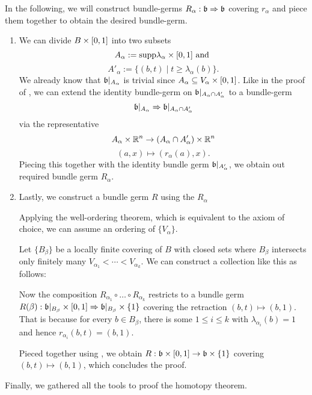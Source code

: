 \begin{scope}
\begin{myproof}
    In the following, we will construct bundle-germs $R_\alpha: \mathfrak{b} \Rightarrow{}{} \mathfrak{b}$ covering $r_\alpha$
    and piece them together to obtain the desired bundle-germ.
    \begin{enumerate}
        \item 
        We can divide $B \times [0, 1]$ into two subsets
        \[ A_\alpha := \text{supp} \lambda_\alpha \times [0, 1] \text{ and } \]
        \[ A'_\alpha := \{(b, t) \mid t \ge \lambda_\alpha(b)\}. \]
        We already know that $\mathfrak{b}\vert_{A_\alpha}$ is trivial since $A_\alpha \subseteq{} V_\alpha \times [0, 1]$.
        Like in the proof of , we can extend the identity bundle-germ on $\mathfrak{b}\vert_{A_\alpha \cap A_\alpha'}$ to a bundle-germ
        \[ \mathfrak{b}\vert_{A_\alpha} \Rightarrow{} \mathfrak{b}\vert_{A_\alpha \cap A_\alpha'} \]
        via the representative
        \[ A_\alpha \times \mathbb{R}^n \to (A_\alpha \cap A_\alpha') \times \mathbb{R}^n\]
        \[ (a, x) \mapsto (r_\alpha(a), x). \]
        Piecing this together with the identity bundle germ $\mathfrak{b}\vert_{A_\alpha'}$, we obtain out required bundle germ $R_\alpha$.
        
        \item Lastly, we construct a bundle germ $R$ using the $R_\alpha$

        Applying the well-ordering theorem, which is equivalent to the axiom of choice, we can assume an ordering of $\{ V_\alpha \}$.

        Let $\{B_\beta\}$ be a locally finite covering of $B$ with closed sets where $B_\beta$ intersects only finitely many $V_{\alpha_1} < \cdots < V_{\alpha_k}$.
        We can construct a collection like this as follows:

        Now the composition $R_{\alpha_1} \circ \ldots \circ R_{\alpha_k}$ restricts to a bundle germ $R(\beta): \mathfrak{b}\vert_{B_\beta} \times [0, 1] \Rightarrow{} \mathfrak{b}\vert_{B_\beta} \times \{1\}$ covering the retraction $(b, t) \mapsto (b, 1)$.
        That is because for every $b \in B_\beta$, there is some $1 \le i \le k$ with $\lambda_{\alpha_i}(b) = 1$ and hence $r_{\alpha_i}(b, t) = (b, 1)$.
        
        Pieced together using , we obtain $R: \mathfrak{b} \times [0, 1]\to \mathfrak{b} \times \{1\}$ covering $(b, t) \mapsto (b, 1)$, which concludes the proof.
    \end{enumerate}    
\end{myproof}

\begin{myparagraph}
    Finally, we gathered all the tools to proof the homotopy theorem.
\end{myparagraph}


\end{scope}
